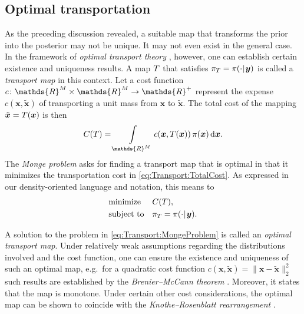 \subsection{Optimal transportation}
As the preceding discussion revealed, a suitable map that transforms the prior into the posterior may not be unique.
It may not even exist in the general case.
In the framework of \emph{optimal transport theory} \cite{Transport:Villani2003,Transport:Villani2008}, however, one can establish certain existence and uniqueness results.
A map \(T\) that satisfies \(\pi_{T} = \pi(\cdot {\:\!}|{\:\!} \bm{y})\) is called a \emph{transport map} in this context.
Let a cost function \(c \colon \mathds{R}^{\dimParam} \times \mathds{R}^{\dimParam} \rightarrow \mathds{R}^{+}\)
represent the expense \(c(\bm{x},\tilde{\bm{x}})\) of transporting a unit mass from \(\bm{x}\) to \(\tilde{\bm{x}}\).
The total cost of the mapping \(\tilde{\bm{x}} = T(\bm{x})\) is then
\begin{equation} \label{eq:Transport:TotalCost}
  C(\map) = \int\limits_{\mathds{R}^{\dimParam}} c(\bm{x}, \map(\bm{x})) \, \pi(\bm{x}) \, \mathrm{d} \bm{x}.
\end{equation}
The \emph{Monge problem} asks for finding a transport map that is optimal in that it minimizes the transportation cost in \cref{eq:Transport:TotalCost}.
As expressed in our density-oriented language and notation, this means to
\begin{equation} \label{eq:Transport:MongeProblem}
  \begin{aligned}
    & \text{minimize} & & C(T), \\
    & \text{subject to} & & \pi_{T} = \pi(\cdot {\:\!}|{\:\!} \bm{y}).
  \end{aligned}
\end{equation}
\par %
A solution to the problem in \cref{eq:Transport:MongeProblem} is called an \emph{optimal transport map}.
Under relatively weak assumptions regarding the distributions involved and the cost function, one can ensure the existence and uniqueness of such an optimal map,
e.g.\ for a quadratic cost function \(c(\bm{x},\tilde{\bm{x}}) = \lVert \bm{x} - \tilde{\bm{x}} \rVert_2^2\)
such results are established by the \emph{Brenier--McCann theorem} \cite{Transport:Brenier1991,Transport:McCann1995}.
Moreover, it states that the map is monotone.
Under certain other cost considerations, the optimal map can be shown to coincide with the \emph{Knothe--Rosenblatt rearrangement} \cite{Transport:Carlier2010,Transport:Bonnotte2013}.
